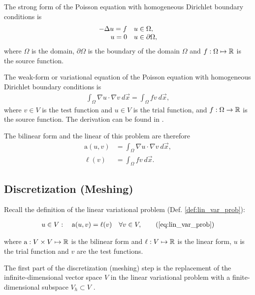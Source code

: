 The strong form of the Poisson equation with homogeneous Dirichlet boundary conditions is
\begin{align}
    \begin{array}{r l}
        -\Delta u = f & u \in \Omega,          \\
        u        = 0  & u \in \partial \Omega,
    \end{array}
    \label{eq:poisson_strong_form}
\end{align}
where $\Omega$ is the domain, $\partial \Omega$ is the boundary of the domain $\Omega$ and $f: \Omega \mapsto \mathbb{R}$ is the source function.

The weak-form or variational equation of the Poisson equation with homogeneous Dirichlet boundary conditions is
\begin{align}
    \int_\Omega \nabla u \cdot \nabla v \ d\vec{x} = \int_\Omega f v \ d\vec{x},
    \label{eq:poisson_weak_form}
\end{align}
where $v \in V$ is the test function and $u \in V$ is the trial function,
and $f: \Omega \to \mathbb{R}$ is the source function.
The derivation can be found in \cite{hiptmair_numerical_2023}.

The bilinear form and the linear of this problem are therefore
\begin{align}
    \mathrm{a}(u, v) & = \int_\Omega \nabla u \cdot \nabla v \ d\vec{x}, \\
    \ell(v)          & = \int_\Omega f v \ d\vec{x}.
\end{align}

\subsection{Discretization (Meshing)}

Recall the definition of the linear variational problem (Def. \ref{def:lin_var_prob}):

\begin{align}
    u \in V: \quad \mathrm{a}(u, v) = \ell(v) \quad \forall v \in V, \tag{\ref{eq:lin_var_prob}}
\end{align}

where $\mathrm{a}: V \times V \mapsto \mathbb{R}$ is the bilinear form and $\ell: V \mapsto \mathbb{R}$
is the linear form, $u$ is the trial function and $v$ are the test functions.

The first part of the discretization (meshing) step is the replacement of the
infinite-dimensional vector space $V$ in the linear variational problem with a
finite-dimensional subspace $V_{h} \subset V$ \cite[Chapter~2.2.1]{hiptmair_numerical_2023}.

